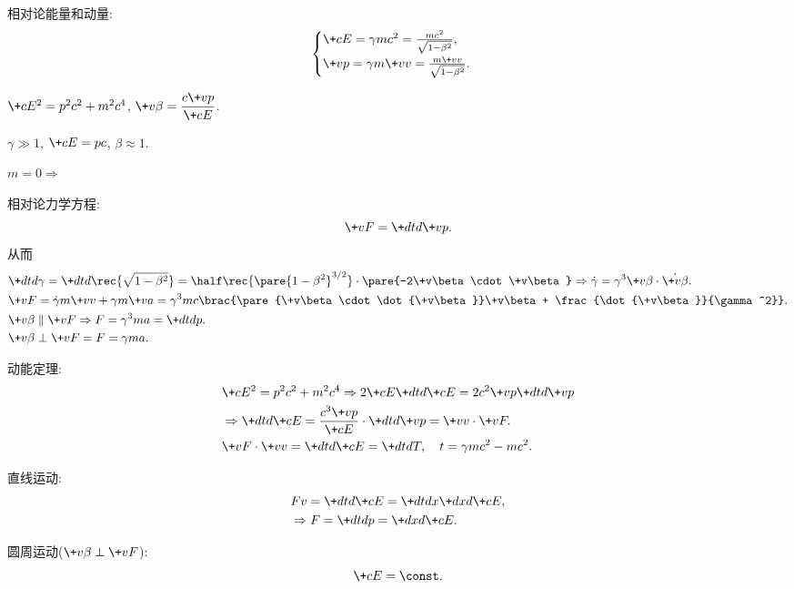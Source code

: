 \documentclass[hidelinks]{ctexart}
\begin{document}
\begin{cenum}
    \item 相对论能量和动量:
    \[ \begin{cases}
        \+cE = \gamma mc^2 = \frac{mc^2}{\sqrt{1-\beta^2}}, \\[.5em]
        \+vp = \gamma m\+vv = \frac{m\+vv}{\sqrt{1-\beta^2}}.
    \end{cases} \]
    \begin{cenum}
        \item $\+cE^2 = p^2c^2 + m^2c^4$, $\displaystyle \+v\beta = \frac{c\+vp}{\+cE}$.
        \item $\gamma \gg 1$, $\displaystyle \+cE = pc$, $\beta \approx 1$.
        \item $\displaystyle m=0 \Rightarrow $
    \end{cenum}
    \item 相对论力学方程:
    \[ \+vF = \+dtd{\+vp}. \]
    从而
    \begin{align*}
        & \+dtd{\gamma} = \+dtd{} \rec{\sqrt{1-\beta^2}} = \half \rec{\pare{1-\beta^2}^{3/2}}\cdot \pare{-2\+v\beta\cdot \+v\beta} \Rightarrow \dot\gamma = \gamma^3 \+v\beta \cdot \dot{\+v\beta}.\\
        & \+vF = \dot{\gamma}m\+vv + \gamma m\+va = \gamma^3 mc\brac{\pare{\+v\beta\cdot \dot{\+v\beta}}\+v\beta + \frac{\dot{\+v\beta}}{\gamma^2}}.\\
        & \+v\beta \parallel \+vF \Rightarrow F = \gamma^3 ma = \+dtd{p}.\\
        & \+v\beta\perp \+vF = F=\gamma ma.
    \end{align*}
    \item 动能定理:
    \begin{align*}
        & \+cE^2 = p^2c^2 + m^2c^4 \Rightarrow 2\+cE \+dtd{\+cE} = 2c^2\+vp\+dtd{\+vp} \\
        & \Rightarrow \+dtd{\+cE} = \frac{c^3 \+vp}{\+cE}\cdot \+dtd{\+vp} = \+vv\cdot \+vF. \\
        & \+vF\cdot \+vv = \+dtd{\+cE} = \+dtdT,\quad t = \gamma mc^2 - mc^2.
    \end{align*}
    \begin{cenum}
        \item 直线运动:
        \begin{align*}
            & Fv = \+dtd{\+cE} = \+dtdx \+dxd{\+cE}, \\
            & \Rightarrow F = \+dtdp = \+dxd{\+cE}.
        \end{align*}
        \item 圆周运动($\+v\beta\perp \+vF$):
        \[ \+cE = \const. \]
    \end{cenum}
\end{cenum}
\end{document}
